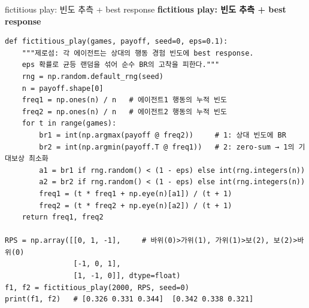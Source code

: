 \begin{frame}[fragile]{fictitious play: 빈도 추측 + best response}
  \textbf{fictitious play: 빈도 추측 + best response}
\begin{lstlisting}
def fictitious_play(games, payoff, seed=0, eps=0.1):
    """제로섬: 각 에이전트는 상대의 행동 경험 빈도에 best response.
    eps 확률로 균등 랜덤을 섞어 순수 BR의 고착을 피한다."""
    rng = np.random.default_rng(seed)
    n = payoff.shape[0]
    freq1 = np.ones(n) / n   # 에이전트1 행동의 누적 빈도
    freq2 = np.ones(n) / n   # 에이전트2 행동의 누적 빈도
    for t in range(games):
        br1 = int(np.argmax(payoff @ freq2))     # 1: 상대 빈도에 BR
        br2 = int(np.argmin(payoff.T @ freq1))   # 2: zero-sum → 1의 기대보상 최소화
        a1 = br1 if rng.random() < (1 - eps) else int(rng.integers(n))
        a2 = br2 if rng.random() < (1 - eps) else int(rng.integers(n))
        freq1 = (t * freq1 + np.eye(n)[a1]) / (t + 1)
        freq2 = (t * freq2 + np.eye(n)[a2]) / (t + 1)
    return freq1, freq2

RPS = np.array([[0, 1, -1],     # 바위(0)>가위(1), 가위(1)>보(2), 보(2)>바위(0)
                [-1, 0, 1],
                [1, -1, 0]], dtype=float)
f1, f2 = fictitious_play(2000, RPS, seed=0)
print(f1, f2)   # [0.326 0.331 0.344]  [0.342 0.338 0.321]
\end{lstlisting}

\end{frame}

